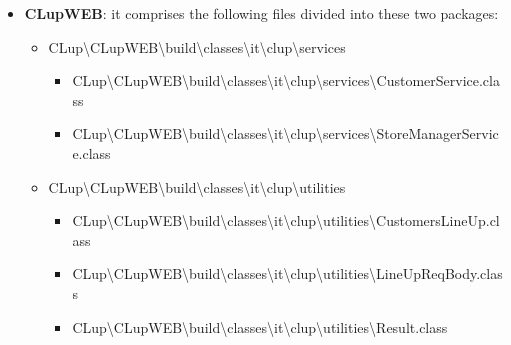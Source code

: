 \begin{itemize}
\begin{itemize}
		\end{itemize}
	\item \textbf{CLupWEB}: it comprises the following files divided into these two packages:
	\begin{itemize}
			\item  CLup\textbackslash CLupWEB\textbackslash build\textbackslash classes\textbackslash it\textbackslash clup\textbackslash services
				\begin{itemize}
						\item  CLup\textbackslash CLupWEB\textbackslash build\textbackslash classes\textbackslash it\textbackslash clup\textbackslash services\textbackslash CustomerService.class
						\item  CLup\textbackslash CLupWEB\textbackslash build\textbackslash classes\textbackslash it\textbackslash clup\textbackslash services\textbackslash StoreManagerService.class
				\end{itemize}

			\item  CLup\textbackslash CLupWEB\textbackslash build\textbackslash classes\textbackslash it\textbackslash clup\textbackslash utilities
				
				\begin{itemize}
						\item  CLup\textbackslash CLupWEB\textbackslash build\textbackslash classes\textbackslash it\textbackslash clup\textbackslash utilities\textbackslash CustomersLineUp.class
						\item  CLup\textbackslash CLupWEB\textbackslash build\textbackslash classes\textbackslash it\textbackslash clup\textbackslash utilities\textbackslash LineUpReqBody.class
						\item  CLup\textbackslash CLupWEB\textbackslash build\textbackslash classes\textbackslash it\textbackslash clup\textbackslash utilities\textbackslash Result.class
				\end{itemize}
		\end{itemize}
\end{itemize}

